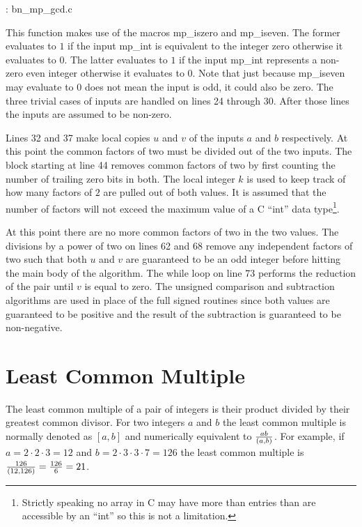 \documentclass[b5paper]{book}
\begin{document}
\vspace{+3mm}\begin{small}
\hspace{-5.1mm}{\bf File}: bn\_mp\_gcd.c
\vspace{-3mm}
\begin{alltt}
\end{alltt}
\end{small}

This function makes use of the macros mp\_iszero and mp\_iseven.  The former evaluates to $1$ if the input mp\_int is equivalent to the 
integer zero otherwise it evaluates to $0$.  The latter evaluates to $1$ if the input mp\_int represents a non-zero even integer otherwise
it evaluates to $0$.  Note that just because mp\_iseven may evaluate to $0$ does not mean the input is odd, it could also be zero.  The three 
trivial cases of inputs are handled on lines 24 through 30.  After those lines the inputs are assumed to be non-zero.

Lines 32 and 37 make local copies $u$ and $v$ of the inputs $a$ and $b$ respectively.  At this point the common factors of two 
must be divided out of the two inputs.  The block starting at line 44 removes common factors of two by first counting the number of trailing
zero bits in both.  The local integer $k$ is used to keep track of how many factors of $2$ are pulled out of both values.  It is assumed that 
the number of factors will not exceed the maximum value of a C ``int'' data type\footnote{Strictly speaking no array in C may have more than 
entries than are accessible by an ``int'' so this is not a limitation.}.  

At this point there are no more common factors of two in the two values.  The divisions by a power of two on lines 62 and 68 remove 
any independent factors of two such that both $u$ and $v$ are guaranteed to be an odd integer before hitting the main body of the algorithm.  The while loop
on line 73 performs the reduction of the pair until $v$ is equal to zero.  The unsigned comparison and subtraction algorithms are used in
place of the full signed routines since both values are guaranteed to be positive and the result of the subtraction is guaranteed to be non-negative.

\section{Least Common Multiple}
The least common multiple of a pair of integers is their product divided by their greatest common divisor.  For two integers $a$ and $b$ the
least common multiple is normally denoted as $[ a, b ]$ and numerically equivalent to ${ab} \over {(a, b)}$.  For example, if $a = 2 \cdot 2 \cdot 3 = 12$
and $b = 2 \cdot 3 \cdot 3 \cdot 7 = 126$ the least common multiple is ${126 \over {(12, 126)}} = {126 \over 6} = 21$.
\end{document}
